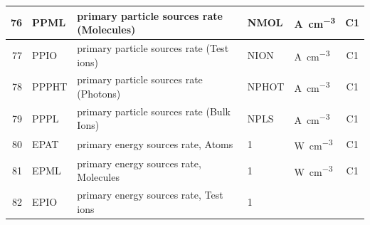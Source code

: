 \begin{landscape}
\begin{longtable}{|r|l|l|l|l|c|}
    \\ \hline
    76                                                             & PPML
                                                                   & primary particle sources
    rate (Molecules)                                               & NMOL                      &
    \si{\ampere\per\cubic\centi\metre}                             & C1
    \\ \hline
    77                                                             & PPIO
                                                                   & primary particle sources
    rate (Test ions)                                               & NION                      &
    \si{\ampere\per\cubic\centi\metre}                             & C1
    \\ \hline
    78                                                             & PPPHT
                                                                   & primary particle sources
    rate (Photons)                                                 & NPHOT                     &
    \si{\ampere\per\cubic\centi\metre}                             & C1
    \\ \hline
    79                                                             & PPPL
                                                                   & primary particle sources
    rate (Bulk Ions)                                               & NPLS                      &
    \si{\ampere\per\cubic\centi\metre}                             & C1
    \\ \hline
    80                                                             & EPAT
                                                                   & primary energy sources
    rate, Atoms                                                    & 1                         & \si{\watt\per\cubic\centi\metre}
                                                                   & C1
    \\ \hline
    81                                                             & EPML
                                                                   & primary energy sources
    rate, Molecules                                                & 1                         &
    \si{\watt\per\cubic\centi\metre}                               & C1
    \\ \hline
    82                                                             & EPIO
                                                                   & primary energy sources
    rate, Test ions                                                & 1                         &

\end{longtable}
\end{landscape}
